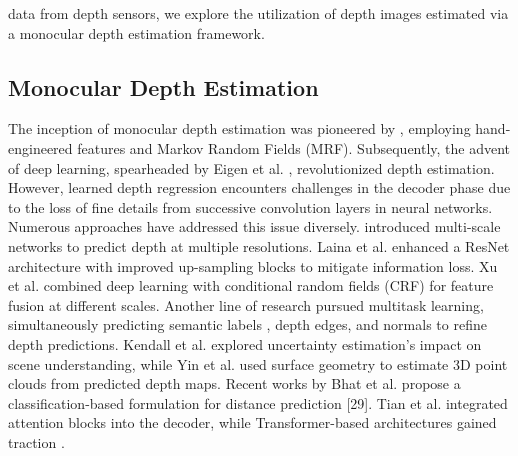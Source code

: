data from depth sensors, we explore the utilization of depth images estimated via a monocular depth estimation framework. 

\subsection{Monocular Depth Estimation}

The inception of monocular depth estimation was pioneered by \cite{saxena2005learning, saxena2008make3d}, employing hand-engineered features and Markov Random Fields (MRF). Subsequently, the advent of deep learning, spearheaded by Eigen et al. \cite{eigen2014depth}, revolutionized depth estimation. However, learned depth regression encounters challenges in the decoder phase due to the loss of fine details from successive convolution layers in neural networks. Numerous approaches have addressed this issue diversely. \cite{eigen2015predicting} introduced multi-scale networks to predict depth at multiple resolutions. Laina et al. \cite{laina2016deeper} enhanced a ResNet architecture with improved up-sampling blocks to mitigate information loss. Xu et al. \cite{xu2017multi} combined deep learning with conditional random fields (CRF) for feature fusion at different scales. Another line of research pursued multitask learning, simultaneously predicting semantic labels \cite{jiao2018look}, depth edges, and normals \cite{ramamonjisoa2019sharpnet, zhang2019pattern, lee2019big} to refine depth predictions. Kendall et al. \cite{kendall2018multi} explored uncertainty estimation's impact on scene understanding, while Yin et al. \cite{yin2019enforcing} used surface geometry to estimate 3D point clouds from predicted depth maps. Recent works by Bhat et al. propose a classification-based formulation for distance prediction [29]. Tian et al. \cite{chen2020improving} integrated attention blocks into the decoder, while Transformer-based architectures gained traction \cite{ranftl2021vision, yang2021transformer}.